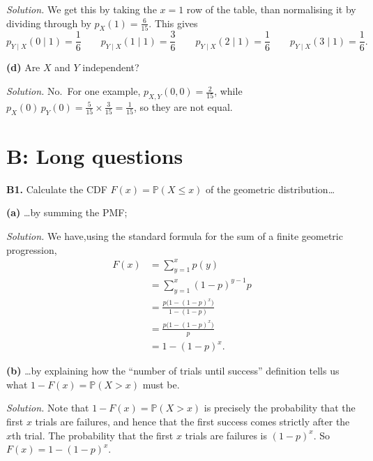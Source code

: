 \documentclass[
  a4paper,
]{book}
\theoremstyle{definition}
\theoremstyle{definition}
\theoremstyle{definition}
\theoremstyle{definition}
\theoremstyle{remark}
\begin{document}
\begin{myanswers}
\emph{Solution.} We get this by taking the \(x = 1\) row of the table, than normalising it by dividing through by \(p_X(1) = \frac{6}{15}\). This gives
\[ p_{Y\mid X} (0 \mid 1) = \frac{1}{6} \qquad p_{Y\mid X} (1 \mid 1) = \frac{3}{6} \qquad p_{Y\mid X} (2 \mid 1) = \frac{1}{6} \qquad p_{Y\mid X} (3 \mid 1) = \frac{1}{6} . \]

\end{myanswers}

\textbf{(d)} Are \(X\) and \(Y\) independent?

\begin{myanswers}
\emph{Solution.} No.~For one example, \(p_{X,Y}(0,0) = \frac{2}{15}\), while \(p_X(0) \, p_Y(0) = \frac{5}{15} \times \frac{3}{15} = \frac{1}{15}\), so they are not equal.

\end{myanswers}

\hypertarget{P4-long}{%
\section*{B: Long questions}\label{P4-long}}

\textbf{B1.} Calculate the CDF \(F(x) = \mathbb P(X \leq x)\) of the geometric distribution\ldots{}

\textbf{(a)} \ldots by summing the PMF;

\begin{myanswers}
\emph{Solution.}
We have,using the standard formula for the sum of a finite geometric progression,
\begin{align*}
F(x) &= \sum_{y = 1}^x p(y) \\
&= \sum_{y = 1}^x (1-p)^{y-1} p \\
&= \frac{p\big(1 - (1-p)^x\big)}{1 - (1-p)} \\
&= \frac{p\big(1 - (1-p)^x\big)}{p} \\
&= 1 - (1 - p)^x .
\end{align*}

\end{myanswers}

\textbf{(b)} \ldots by explaining how the ``number of trials until success'' definition tells us what \(1 - F(x) = \mathbb P(X > x)\) must be.

\begin{myanswers}
\emph{Solution.}
Note that \(1 - F(x) = \mathbb P(X > x)\) is precisely the probability that the first \(x\) trials are failures, and hence that the first success comes strictly after the \(x\)th trial. The probability that the first \(x\) trials are failures is \((1-p)^x\). So \(F(x) = 1 - (1-p)^x\).

\end{myanswers}
\end{document}
